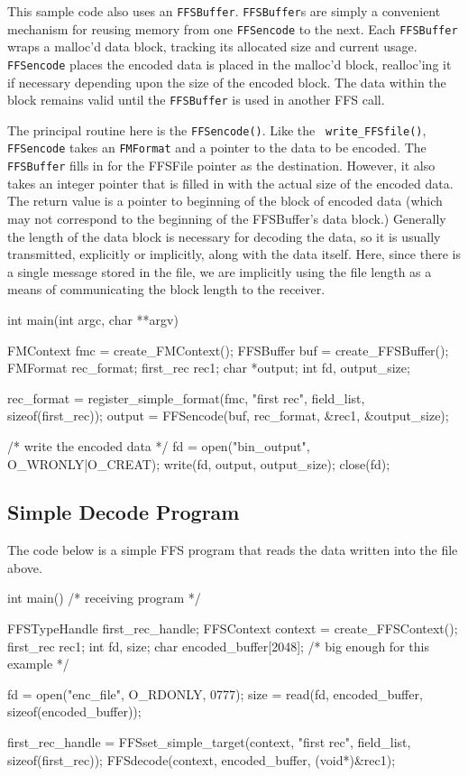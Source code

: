 This sample code also uses an {\tt FFSBuffer}.  {\tt FFSBuffer}s are simply
a convenient mechanism for reusing memory from one {\tt FFSencode} to the
next.  Each {\tt FFSBuffer} wraps a malloc'd data block, tracking its
allocated size and current usage.  {\tt FFSencode} places the encoded data
is placed in the malloc'd block, realloc'ing it if necessary depending 
upon the size of the encoded block.  The data within the block remains
valid until the {\tt FFSBuffer} is used in another FFS call.

The principal routine here is the {\tt FFSencode()}.  Like the {\tt
write\_FFSfile()}, {\tt FFSencode} takes an {\tt FMFormat} and a pointer
to the data to be encoded.  The {\tt FFSBuffer} fills in for the FFSFile
pointer as the destination.  However, it also takes an integer pointer that
is filled in with the actual size of the encoded data.  The return value is
a pointer to beginning of the block of encoded data (which may not
correspond to the beginning of the FFSBuffer's data block.)  Generally the
length of the data block is necessary for decoding the data, so it is
usually transmitted, explicitly or implicitly, along with the data itself.
Here, since there is a single message stored in the file, we are implicitly
using the file length as a means of communicating the block length to the
receiver.

\begin{Code}
int main(int argc, char **argv)
{
    FMContext fmc = create_FMContext();
    FFSBuffer buf = create_FFSBuffer();
    FMFormat rec_format;
    first_rec rec1;
    char *output;
    int fd, output_size;

    rec_format = register_simple_format(fmc, "first rec", field_list, sizeof(first_rec));
    output = FFSencode(buf, rec_format, &rec1, &output_size);

    /* write the encoded data */
    fd = open("bin_output", O_WRONLY|O_CREAT);
    write(fd, output, output_size);
    close(fd);
}
\end{Code}

\subsection{Simple Decode Program}

The code below is a simple FFS program that reads the data written into the
file above.  
\begin{Code}
int main()     /* receiving program */
{
    FFSTypeHandle first_rec_handle;
    FFSContext context = create_FFSContext();
    first_rec rec1;
    int fd, size;
    char encoded_buffer[2048];  /* big enough for this example */

    fd = open("enc_file", O_RDONLY, 0777);
    size = read(fd, encoded_buffer, sizeof(encoded_buffer));

    first_rec_handle = FFSset_simple_target(context, "first rec", field_list, sizeof(first_rec));
    FFSdecode(context, encoded_buffer, (void*)&rec1);
}
\end{Code}

